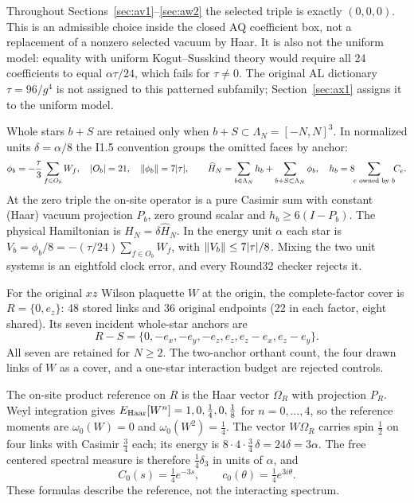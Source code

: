 Throughout Sections~\ref{sec:av1}--\ref{sec:aw2} the selected triple is
exactly $(0,0,0)$. This is an
admissible choice inside the closed AQ coefficient box, not a replacement of a
nonzero selected vacuum by Haar. It is also not the uniform model: equality
with uniform Kogut--Susskind theory would require all 24 coefficients to equal
$\alpha\tau/24$, which fails for $\tau\ne0$. The original AL dictionary
$\tau=96/g^4$ is not assigned to this patterned subfamily; Section~\ref{sec:ax1}
assigns it to the uniform model.

Whole stars $b+S$ are retained only when $b+S\subset\Lambda_N=[-N,N]^3$. In
normalized units $\delta=\alpha/8$ the I1.5 convention groups the omitted faces
by anchor:
\begin{equation}
 \phi_b=-\frac{\tau}{3}\sum_{f\in O_b}W_f,\quad |O_b|=21,\quad
 \left\lVert\phi_b\right\rVert=7|\tau|,\qquad
 \widehat H_N=\sum_{b\in\Lambda_N}h_b+\sum_{b+S\subset\Lambda_N}\phi_b,\quad
 h_b=8\!\!\sum_{e\text{ owned by }b}\!\!C_e .
 \label{eq:dict-star}
\end{equation}
At the zero triple the on-site operator is a pure Casimir sum with constant
(Haar) vacuum projection $P_b$, zero ground scalar and $h_b\ge6(I-P_b)$. The
physical Hamiltonian is $H_N=\delta\widehat H_N$. In the energy unit $\alpha$
each star is $V_b=\phi_b/8=-(\tau/24)\sum_{f\in O_b}W_f$, with
$\left\lVert V_b\right\rVert\le7|\tau|/8$. Mixing the two unit systems is an eightfold clock
error, and every Round32 checker rejects it.

For the original $xz$ Wilson plaquette $W$ at the origin, the complete-factor
cover is $R=\{0,e_z\}$: 48 stored links and 36 original endpoints (22 in each
factor, eight shared). Its seven incident whole-star anchors are
\begin{equation}
 R-S=\{0,-e_x,-e_y,-e_z,e_z,e_z-e_x,e_z-e_y\}.
 \label{eq:dict-seven}
\end{equation}
All seven are retained for $N\ge2$. The two-anchor orthant count, the four
drawn links of $W$ as a cover, and a one-star interaction budget are rejected
controls.

The on-site product reference on $R$ is the Haar vector $\Omega_R$ with
projection $P_R$. Weyl integration gives
$E_{\rm Haar}[W^n]=1,0,\tfrac14,0,\tfrac18$ for $n=0,\dots,4$, so the reference
moments are $\omega_0(W)=0$ and $\omega_0(W^2)=\tfrac14$. The vector
$W\Omega_R$ carries spin $\tfrac12$ on four links with Casimir $\tfrac34$
each; its energy is $8\cdot4\cdot\tfrac34\,\delta=24\delta=3\alpha$. The free
centered spectral measure is therefore $\tfrac14\delta_3$ in units of
$\alpha$, and
\begin{equation}
 C_0(s)=\tfrac14e^{-3s},\qquad c_0(\theta)=\tfrac14e^{3i\theta}.
 \label{eq:dict-reference}
\end{equation}
These formulas describe the reference, not the interacting spectrum.

